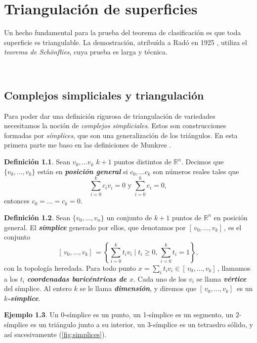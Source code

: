 \documentclass[10pt]{report}
\newcommand{\R}{\mathbb{R}}
\newcommand{\enfatiza}[1]{\textbf{\textit{#1}}}
\theoremstyle{definition}
\newtheorem{defin}{Definición}[section]
\newtheorem{eje}[defin]{Ejemplo}
\begin{document}
\chapter{Triangulación de superficies}

Un hecho fundamental para la prueba del teorema de clasificación es que toda superficie es triangulable. La demostración, atribuída a Radó en 1925 \cite{rado}, utiliza el \emph{teorema de Schönflies}, cuya prueba es larga y técnica. 
\

\section{Complejos simpliciales y triangulación}\label{sec:simplices}

Para poder dar una definición rigurosa de triangulación de variedades necesitamos la noción de \textit{complejos simpliciales}. Estos son construcciones formadas por \textit{símplices}, que son una generalización de los triángulos. En esta primera parte me baso en las definiciones de Munkres \cite{munkres}.

\begin{defin}%
Sean $v_0,\dots v_k$ $k+1$ puntos distintos de $\R^n$. Decimos que $\{ v_0,\dots ,v_k\}$ están en \enfatiza{posición general} si $c_0,\dots c_k$ son números reales tales que  $$\sum_{i=0}^{k}c_iv_i=0 \text{ y } \sum_{i=0}^kc_i=0,$$ entonces $c_0=\dots =c_k=0$.
\end{defin}


\begin{defin}%
Sean $\{ v_0,\dots ,v_n\}$ un conjunto de $k+1$ puntos de $\R^n$ en posición general. El \enfatiza{símplice} generado por ellos, que denotamos por $[ \, v_0,\dots ,v_k ] \,$, es el conjunto $$[ \, v_0,\dots ,v_k] \, =\left\{  \sum_{i=0}^{k}t_iv_i \mid t_i\geq 0,\, \sum_{i=0}^{k}t_i=1 \right\}, $$ con la topología heredada. Para todo punto $x=\sum_it_iv_i\in [ \, v_0,\dots ,v_k] \,$, llamamos a los $t_i$ \enfatiza{coordenadas baricéntricas de $x$}. Cada uno de los $v_i$ se llama \enfatiza{vértice} del símplice. Al entero $k$ se le llama \enfatiza{dimensión}, y diremos que $[ \, v_0,\dots ,v_k] \,$ es un \enfatiza{$k$-símplice}. 
\end{defin}

\begin{eje}
Un $0$-símplice es un punto, un 1-símplice es un segmento, un $2$-símplice es un triángulo junto a su interior, un $3$-símplice es un tetraedro sólido, y así sucesivamente (\autoref{fig:simplices}).
\end{eje}
\end{document}
